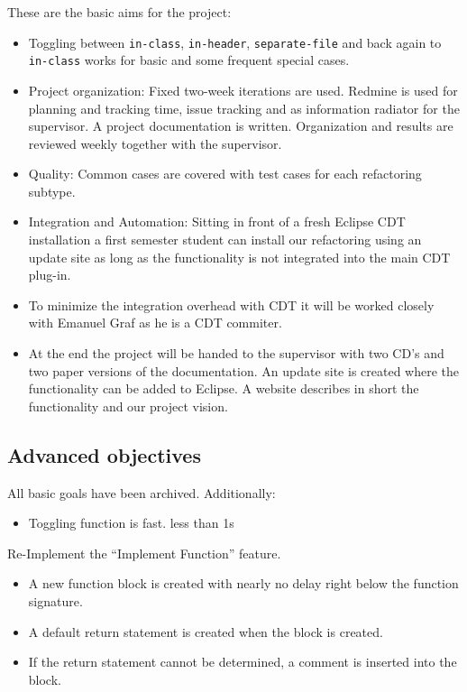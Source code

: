 These are the basic aims for the project:
\begin{itemize}
 \item Toggling between \texttt{in-class}, \texttt{in-header},
\texttt{separate-file} and back again to \texttt{in-class} works for basic and
some frequent special cases.
 \item Project organization: Fixed two-week iterations are used. Redmine is used
for planning and tracking time, issue tracking and as information radiator for
the supervisor. A project documentation is written. Organization and results are
reviewed weekly together with the supervisor.
 \item Quality: Common cases are covered with test cases for each
refactoring subtype.
 \item Integration and Automation: Sitting in front of a fresh Eclipse CDT
installation a first semester student can install our refactoring using an
update site as long as the functionality is not integrated into the main CDT
plug-in.
 \item To minimize the integration overhead with CDT it will be worked closely
with Emanuel Graf as he is a CDT commiter.
 \item At the end the project will be handed to the supervisor with two CD's and
two paper versions of the documentation. An update site is created where the
functionality can be added to Eclipse. A website describes in short the
functionality and our project vision.
\end{itemize}

\subsection{Advanced objectives}
All basic goals have been archived. Additionally:\newline
\begin{itemize}
 \item Toggling function is fast. less than 1s
\end{itemize}

Re-Implement the ``Implement Function'' feature.
\begin{itemize}
 \item A new function block is created with nearly no delay right below the
function signature.
 \item A default return statement is created when the block is created.
 \item If the return statement cannot be determined, a comment is inserted into
the block.
\end{itemize}

